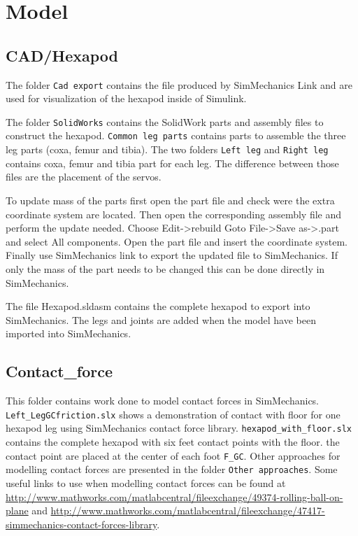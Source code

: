 \documentclass[letterpaper, 10 pt]{report}
\begin{document}
\section{Model}

\subsection{CAD/Hexapod}
The folder \texttt{Cad export} contains the file produced by SimMechanics Link and are used for visualization of the hexapod inside of Simulink.

The folder \texttt{SolidWorks} contains the SolidWork parts and assembly files to construct the hexapod.
\texttt{Common leg parts} contains parts to assemble  the three leg parts (coxa, femur and tibia).
The two folders \texttt{Left leg} and \texttt{Right leg} contains coxa, femur and tibia part for each leg.
The difference between those files are the placement of the servos.
 
To update mass of the parts first open the part file and check were the extra coordinate system are located. 
Then open the corresponding assembly file and perform the update needed.
Choose Edit->rebuild 
Goto File->Save as->.part and select All components.
Open the part file and insert the coordinate system.
Finally use SimMechanics link to export the updated file to SimMechanics.
If only the mass of the part needs to be changed this can be done directly in SimMechanics.

The file Hexapod.sldasm contains the complete hexapod to export into SimMechanics. 
The legs and joints are added when the model have been imported into SimMechanics.


\subsection{Contact{\_}force}
This folder contains work done to model contact forces in SimMechanics.
\texttt{Left{\_}LegGCfriction.slx} shows a demonstration of contact with floor for one hexapod leg using SimMechanics contact force library.
\texttt{hexapod{\_}with{\_}floor.slx} contains the complete hexapod with six feet contact points with the floor.
the contact point are placed at the center of each foot \texttt{F{\_}GC}.
Other approaches for modelling contact forces are presented in the folder \texttt{Other approaches}.
Some useful links to use when modelling contact forces can be found at 
\url{http://www.mathworks.com/matlabcentral/fileexchange/49374-rolling-ball-on-plane}
and
\url{http://www.mathworks.com/matlabcentral/fileexchange/47417-simmechanics-contact-forces-library}.
\end{document}
